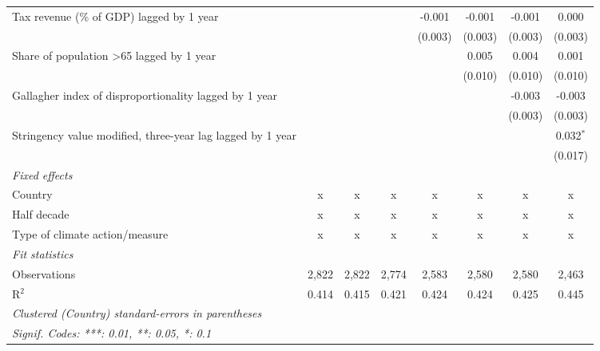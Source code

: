 \begin{tabular}{lccccccc}
   Tax revenue (\% of GDP) lagged by 1 year                                      &         &         &         & -0.001      & -0.001      & -0.001      & 0.000\\   
                                                                                 &         &         &         & (0.003)     & (0.003)     & (0.003)     & (0.003)\\   
   Share of population >65 lagged by 1 year                                      &         &         &         &             & 0.005       & 0.004       & 0.001\\   
                                                                                 &         &         &         &             & (0.010)     & (0.010)     & (0.010)\\   
   Gallagher index of disproportionality lagged by 1 year                        &         &         &         &             &             & -0.003      & -0.003\\   
                                                                                 &         &         &         &             &             & (0.003)     & (0.003)\\   
   Stringency value modified, three-year lag lagged by 1 year                    &         &         &         &             &             &             & 0.032$^{*}$\\   
                                                                                 &         &         &         &             &             &             & (0.017)\\   
   \emph{Fixed effects}\\
   Country                                                                       & x       & x       & x       & x           & x           & x           & x\\  
   Half decade                                                                   & x       & x       & x       & x           & x           & x           & x\\  
   Type of climate action/measure                                                & x       & x       & x       & x           & x           & x           & x\\  
   \midrule \emph{Fit statistics}\\
   Observations                                                                  & 2,822   & 2,822   & 2,774   & 2,583       & 2,580       & 2,580       & 2,463\\  
   R$^2$                                                                         & 0.414   & 0.415   & 0.421   & 0.424       & 0.424       & 0.425       & 0.445\\  
   \midrule
   \multicolumn{8}{l}{\emph{Clustered (Country) standard-errors in parentheses}}\\
   \multicolumn{8}{l}{\emph{Signif. Codes: ***: 0.01, **: 0.05, *: 0.1}}\\
\end{tabular}
\par\endgroup



